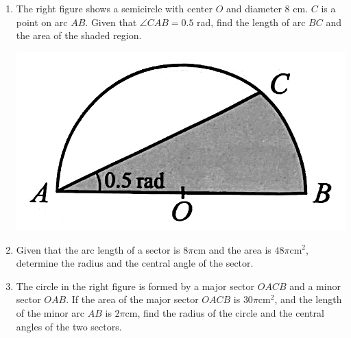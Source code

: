 \documentclass{report}
\begin{document}
\begin{enumerate}
	\item \begin{multicols}{2}
	      The right figure shows a semicircle with center $O$ and diameter $8$ cm. $C$ is a point on arc $AB$. Given that $\angle CAB=0.5$ rad, find the length of arc $BC$ and the area of the shaded region.
	      
	      \begin{center}
	      	\includegraphics[scale=0.14]{assets/8-17.png}
	      \end{center}
	\end{multicols}
	
	\item Given that the arc length of a sector is $8 \pi \mathrm{cm}$ and the area is $48 \pi \mathrm{cm}^2$, determine the radius and the central angle of the sector.
	      
	\item \begin{multicols}{2}
	      The circle in the right figure is formed by a major sector $OACB$ and a minor sector $OAB$. If the area of the major sector $OACB$ is $30 \pi \mathrm{cm}^2$, and the length of the minor arc $AB$ is $2 \pi \mathrm{cm}$, find the radius of the circle and the central angles of the two sectors.
	      

\end{multicols}
\end{enumerate}
\end{document}

